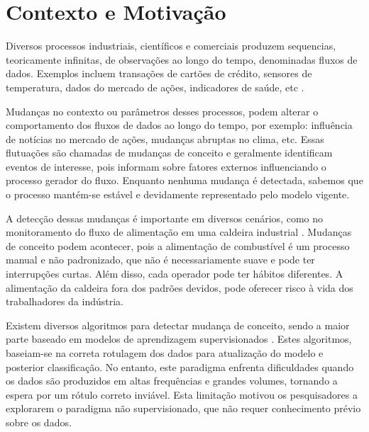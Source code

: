 \documentclass[qual, classic, a4paper]{ufbathesis}
\begin{document}
\listoftables

\mainmatter

% 
% 
% 
%

 \label{introducao}

\section{Contexto e Motivação}

Diversos processos industriais, científicos e comerciais produzem sequencias, teoricamente infinitas, de observações ao longo do tempo, denominadas fluxos de dados. Exemplos incluem transações de cartões de crédito, sensores de temperatura, dados do mercado de ações, indicadores de saúde, etc \cite{Aggarwal:2003:FCE:1315451.1315460}. 

Mudanças no contexto ou parâmetros desses processos, podem alterar o comportamento dos fluxos de dados ao longo do tempo, por exemplo: influência de notícias no mercado de ações, mudanças abruptas no clima, etc. 
Essas flutuações são chamadas de mudanças de conceito e geralmente identificam eventos de interesse, pois informam sobre fatores externos influenciando o processo gerador do fluxo. Enquanto nenhuma mudança é detectada, sabemos que o processo mantém-se estável e devidamente representado pelo modelo vigente.
 
A detecção dessas mudanças é importante em diversos cenários, como no monitoramento do fluxo de alimentação em uma caldeira industrial \cite{6294406}. Mudanças de conceito podem acontecer, pois a alimentação de combustível é um processo manual e não padronizado, que não é necessariamente suave e pode ter interrupções curtas. Além disso, cada operador pode ter hábitos diferentes. 
A alimentação da caldeira fora dos padrões devidos, pode oferecer risco à vida dos trabalhadores da indústria.

Existem diversos algoritmos para detectar mudança de conceito, sendo a maior parte baseado em modelos de aprendizagem supervisionados \cite{Gama:2014:SCD:2597757.2523813}. 
Estes algoritmos, baseiam-se na correta rotulagem dos dados para atualização do modelo e posterior classificação. No entanto, este paradigma enfrenta dificuldades quando os dados são produzidos em altas frequências e grandes volumes, tornando a espera por um rótulo correto inviável.
Esta limitação motivou os pesquisadores a explorarem o paradigma não supervisionado, que não requer conhecimento prévio sobre os dados.
\end{document}

